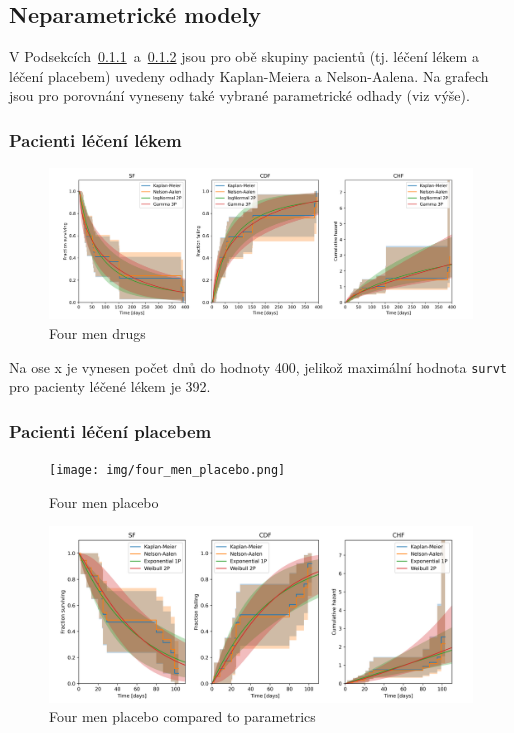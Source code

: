 \documentclass[a4, 11pt]{article}
\theoremstyle{definition}
\theoremstyle{remark}
\begin{document}
    
    
    
	
	\subsection{Neparametrické modely} \label{sec:non_parametric_all}
	V Podsekcích~\ref{sec:non_parametric_drugs}~a~\ref{sec:non_parametric_placebo} jsou pro obě skupiny pacientů (tj. léčení lékem a léčení placebem) uvedeny odhady Kaplan-Meiera a Nelson-Aalena.
	Na grafech jsou pro porovnání vyneseny také vybrané parametrické odhady (viz výše).
	
	\subsubsection{Pacienti léčení lékem} \label{sec:non_parametric_drugs}
	
	\begin{figure}[H]
		\centering
		\includegraphics[width=0.9\linewidth]{img/four_men_drugs.png}
		\caption{Four men drugs}
		\label{fig:four_men_drugs}
	\end{figure}

	Na ose x je vynesen počet dnů do hodnoty 400, jelikož maximální hodnota \texttt{survt} pro pacienty léčené lékem je 392.
	
	\subsubsection{Pacienti léčení placebem} \label{sec:non_parametric_placebo}
	
	\begin{figure}[H]
		\centering
		\texttt{[image: img/four\_men\_placebo.png]}
		\caption{Four men placebo}
		\label{fig:four_men_placebo}
	\end{figure}

	\begin{figure}[H]
	\centering
	\includegraphics[width=0.9\linewidth]{img/four_men_placebo_compared_to_parametrics.png}
	\caption{Four men placebo compared to parametrics}
	\label{fig:four_men_placebo}
\end{figure}
	
\end{document}

